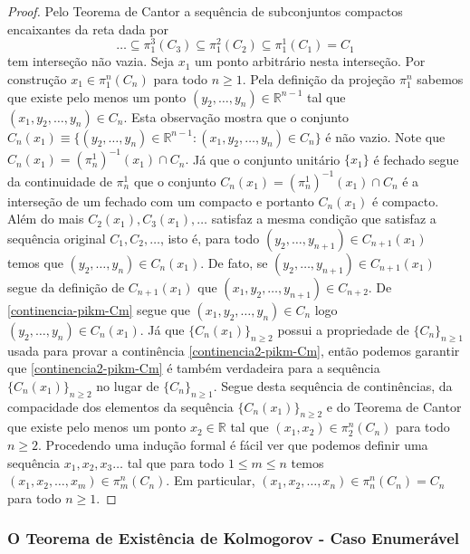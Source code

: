 \begin{proof}
Pelo Teorema de Cantor 
a sequência de subconjuntos compactos encaixantes 
da reta dada por 
\begin{equation}
\label{continencia2-pikm-Cm}
\ldots \subseteq 
\pi_{1}^{3}(C_3)
\subseteq
\pi^{2}_{1}(C_2)
\subseteq 
\pi^{1}_{1}(C_1) 
=
C_1
\end{equation}
tem interseção não vazia.
Seja $x_1$ um ponto arbitrário nesta interseção.
Por construção $x_1\in \pi_{1}^{n}(C_n)$ 
para todo $n\geq 1$. Pela definição da projeção
$\pi_{1}^{n}$ sabemos que     
existe pelo menos um ponto 
$(y_2,\ldots,y_{n})\in \mathbb{R}^{n-1}$ 
tal que $(x_1,y_2,\ldots,y_{n})\in C_n$.
Esta observação mostra que o conjunto 
$C_n(x_1)
\equiv 
\{ 
(y_2,\ldots,y_{n})\in\mathbb{R}^{n-1}
: (x_1,y_2,\ldots,y_{n})\in C_n
\}$ 
é não vazio.
Note que 
$
C_{n}(x_1) 
= 
(\pi_{n}^{1})^{-1}(x_1)\cap C_n.
$
Já que o conjunto unitário $\{x_1\}$ é fechado
segue da continuidade de $\pi_{n}^{1}$ 
que o conjunto 
$C_{n}(x_1)=(\pi_{n}^{1})^{-1}(x_1)\cap C_n$ é a interseção
de um fechado com um compacto e portanto $C_{n}(x_1)$
é compacto.
Além do mais $C_2(x_1), C_3(x_1),\ldots$
satisfaz a mesma condição que satisfaz a 
sequência original $C_1,C_2,\ldots$, isto é, 
para todo $(y_2,\ldots,y_{n+1})\in C_{n+1}(x_1)$
temos que $(y_2,\ldots,y_n)\in C_{n}(x_1)$.
De fato, se $(y_2,\ldots,y_{n+1})\in C_{n+1}(x_1)$
segue da definição de $C_{n+1}(x_1)$ que 
$(x_1,y_2,\ldots,y_{n+1})\in C_{n+2}$. 
De \eqref{continencia-pikm-Cm} segue que 
$(x_1,y_2,\ldots,y_n)\in C_n$ 
logo $(y_2,\ldots,y_{n})\in C_{n}(x_1)$.
Já que $\{C_n(x_1)\}_{n\geq 2}$ possui a propriedade
de $\{C_n\}_{n\geq 1}$ usada para provar 
a continência \eqref{continencia2-pikm-Cm}, 
então podemos garantir que \eqref{continencia2-pikm-Cm}
é também verdadeira para a sequência $\{C_n(x_1)\}_{n\geq 2}$
no lugar de $\{C_n\}_{n\geq 1}$. 
Segue desta sequência de continências,
da compacidade dos elementos da sequência 
$\{C_n(x_1)\}_{n\geq 2}$ e 
do Teorema de Cantor que existe pelo menos 
um ponto $x_2\in\mathbb{R}$ tal que $(x_1,x_2)\in \pi^{n}_2(C_n)$
para todo $n\geq 2$. Procedendo uma indução formal é fácil 
ver que podemos definir uma sequência $x_1,x_2,x_3\ldots$ 
tal que para todo $1\leq m\leq n$ temos 
$(x_1,x_2,\ldots,x_m)\in \pi^{n}_{m}(C_n)$.
Em particular, $(x_1,x_2,\ldots,x_n)\in \pi^{n}_{n}(C_n)=C_n$
para todo $n\geq 1$.
\end{proof}



\subsubsection{O Teorema de Existência de Kolmogorov - Caso Enumerável}

